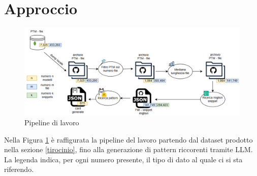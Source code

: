 \documentclass{article}
\begin{document}
\section{Approccio}
\begin{figure}[htbp]
    \centering
    \includegraphics[width=\linewidth]{images/approccio_schema.png}
    \caption{Pipeline di lavoro}
    \label{fig:approccio_schema}
\end{figure}
Nella Figura \ref{fig:approccio_schema} è raffigurata la pipeline del lavoro partendo dal dataset prodotto nella sezione \ref{tirocinio}, fino alla generazione di pattern riccorenti tramite LLM. La legenda indica, per ogni numero presente, il tipo di dato al quale ci si sta riferendo.
\end{document}
